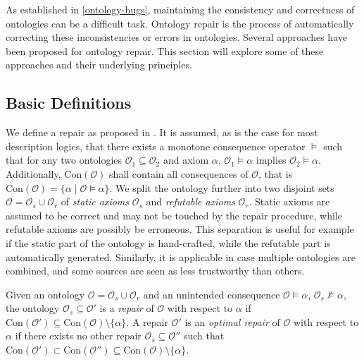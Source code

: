 
As established in \cref{ontology-bugs}, maintaining the consistency and correctness of ontologies can be a difficult task. Ontology repair is the process of automatically correcting these inconsistencies or errors in ontologies. Several approaches have been proposed for ontology repair.  This section will explore some of these approaches and their underlying principles.

\subsection{Basic Definitions} \label{basic-definitions}

We define a repair as proposed in \cite{baader2018making}. It is assumed, as is the case for most description logics, that there exists a monotone consequence operator $\vDash$ such that for any two ontologies $\mathcal{O}_1 \subseteq \mathcal{O}_2$ and axiom $\alpha$, $\mathcal{O}_1 \vDash \alpha$ implies $\mathcal{O}_2 \vDash \alpha$. Additionally, $\mathrm{Con}(\mathcal{O})$ shall contain all consequences of $\mathcal{O}$, that is $\mathrm{Con}(\mathcal{O}) = \{ \alpha \mid \mathcal{O} \vDash \alpha \}$. We split the ontology further into two disjoint sets $\mathcal{O} = \mathcal{O}_s \cup \mathcal{O}_r$ of \emph{static axioms} $\mathcal{O}_s$ and \emph{refutable axioms} $\mathcal{O}_r$. Static axioms are assumed to be correct and may not be touched by the repair procedure, while refutable axioms are possibly be erroneous. This separation is useful for example if the static part of the ontology is hand-crafted, while the refutable part is automatically generated. Similarly, it is applicable in case multiple ontologies are combined, and some sources are seen as less trustworthy than others.

\begin{definition}
Given an ontology $\mathcal{O} = \mathcal{O}_s \cup \mathcal{O}_r$ and an unintended consequence $\mathcal{O} \vDash \alpha$, $\mathcal{O}_s \not\vDash \alpha$, the ontology $\mathcal{O}_s \subseteq \mathcal{O}'$ is a \emph{repair} of $\mathcal{O}$ with respect to $\alpha$ if $\mathrm{Con}(\mathcal{O}') \subseteq \mathrm{Con}(\mathcal{O}) \setminus \{\alpha\}.$ A repair $\mathcal{O}'$ is an \emph{optimal repair} of $\mathcal{O}$ with respect to $\alpha$ if there exists no other repair $\mathcal{O}_s \subseteq \mathcal{O}''$ such that $\mathrm{Con}(\mathcal{O}') \subset \mathrm{Con}(\mathcal{O}'') \subseteq \mathrm{Con}(\mathcal{O}) \setminus \{\alpha\}$.
\end{definition}

